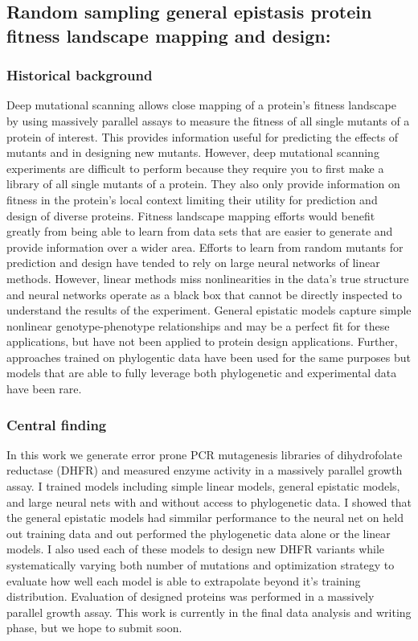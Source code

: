 \documentclass{article}
\begin{document}
%
\nocite{Desmarais2019-yc,Desmarais2018-ac,Desmarais2019-dc,Flamholz2022-yo}
\printbibliography[heading=none]

\leavevmode\newline

\subsection{Random sampling general epistasis protein fitness landscape mapping and design:}
\subsubsection{Historical background}
Deep mutational scanning allows close mapping of a protein's fitness landscape by using massively parallel assays to measure the fitness of all single mutants of a protein of interest.
This provides information useful for predicting the effects of mutants and in designing new mutants.
However, deep mutational scanning experiments are difficult to perform because they require you to first make a library of all single mutants of a protein.
They also only provide information on fitness in the protein's local context limiting their utility for prediction and design of diverse proteins.
Fitness landscape mapping efforts would benefit greatly from being able to learn from data sets that are easier to generate and provide information over a wider area.
Efforts to learn from random mutants for prediction and design have tended to rely on large neural networks of linear methods.
However, linear methods miss nonlinearities in the data's true structure and neural networks operate as a black box that cannot be directly inspected to understand the results of the experiment.
General epistatic models capture simple nonlinear genotype-phenotype relationships and may be a perfect fit for these applications, but have not been applied to protein design applications.
Further, approaches trained on phylogentic data have been used for the same purposes but models that are able to fully leverage both phylogenetic and experimental data have been rare.
%
\subsubsection{Central finding}
In this work we generate error prone PCR mutagenesis libraries of dihydrofolate reductase (DHFR) and measured enzyme activity in a massively parallel growth assay. 
I trained models including simple linear models, general epistatic models, and large neural nets with and without access to phylogenetic data. 
I showed that the general epistatic models had simmilar performance to the neural net on held out training data and out performed the phylogenetic data alone or the linear models. 
I also used each of these models to design new DHFR variants while systematically varying both number of mutations and optimization strategy to evaluate how well each model is able to extrapolate beyond it's training distribution.
Evaluation of designed proteins was performed in a massively parallel growth assay.
This work is currently in the final data analysis and writing phase, but we hope to submit soon.
%
\end{document}
